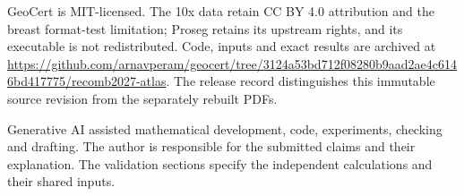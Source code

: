 \documentclass[10pt,letterpaper]{article}
\begin{document}
GeoCert is MIT-licensed. The 10x data retain CC BY 4.0 attribution and the breast format-test limitation; Proseg retains its upstream rights, and its executable is not redistributed. Code, inputs and exact results are archived at \url{https://github.com/arnavperam/geocert/tree/3124a53bd712f08280b9aad2ae4c6146bd417775/recomb2027-atlas}. The release record distinguishes this immutable source revision from the separately rebuilt PDFs.

Generative AI assisted mathematical development, code, experiments, checking and drafting. The author is responsible for the submitted claims and their explanation. The validation sections specify the independent calculations and their shared inputs.
\FloatBarrier

\end{document}
